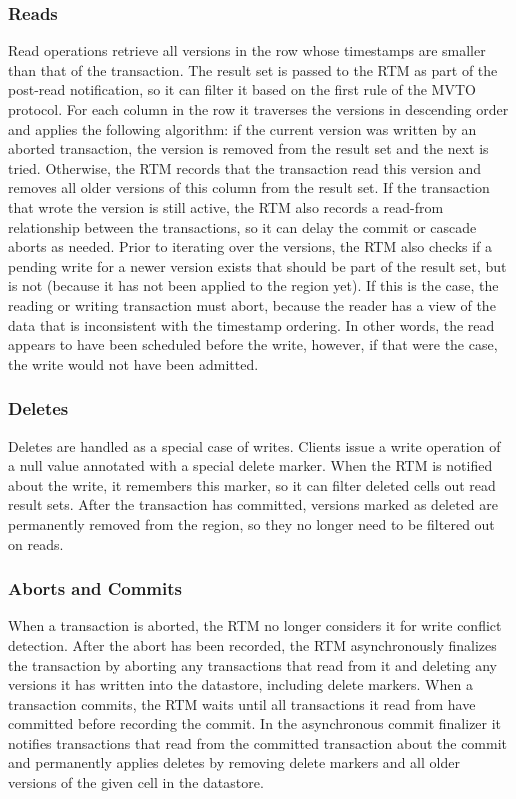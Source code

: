 \documentclass[10pt,final,journal]{IEEEtran}
\begin{document}
\subsubsection{Reads}
Read operations retrieve all versions in the row whose timestamps are smaller than that of the transaction. The result set is passed to the RTM as part of the post-read notification, so it can filter it based on the first rule of the MVTO protocol. For each column in the row it traverses the versions in descending order and applies the following algorithm: if the current version was written by an aborted transaction, the version is removed from the result set and the next is tried. Otherwise, the RTM records that the transaction read this version and removes all older versions of this column from the result set. If the transaction that wrote the version is still active, the RTM also records a read-from relationship between the transactions, so it can delay the commit or cascade aborts as needed. Prior to iterating over the versions, the RTM also checks if a pending write for a newer version exists that should be part of the result set, but is not (because it has not been applied to the region yet). If this is the case, the reading or writing transaction must abort, because the reader has a view of the data that is inconsistent with the timestamp ordering. In other words, the read appears to have been scheduled before the write, however, if that were the case, the write would not have been admitted.

\subsubsection{Deletes}
Deletes are handled as a special case of writes. Clients issue a write operation of a null value annotated with a special delete marker. When the RTM is notified about the write, it remembers this marker, so it can filter deleted cells out read result sets. After the transaction has committed, versions marked as deleted are permanently removed from the region, so they no longer need to be filtered out on reads.

\subsubsection{Aborts and Commits}
When a transaction is aborted, the RTM no longer considers it for write conflict detection. After the abort has been recorded, the RTM asynchronously finalizes the transaction by aborting any transactions that read from it and deleting any versions it has written into the datastore, including delete markers. When a transaction commits, the RTM waits until all transactions it read from have committed before recording the commit. In the asynchronous commit finalizer it notifies transactions that read from the committed transaction about the commit and permanently applies deletes by removing delete markers and all older versions of the given cell in the datastore.
\end{document}
